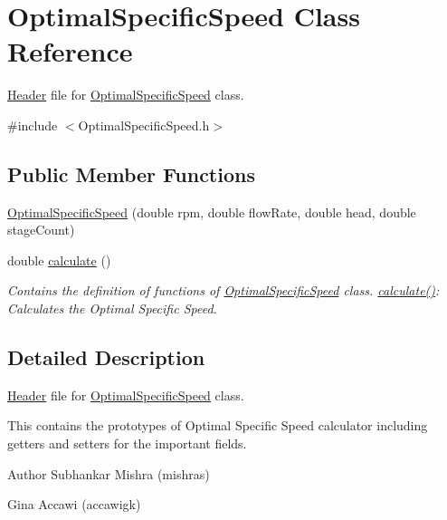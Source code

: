\hypertarget{class_optimal_specific_speed}{}\section{Optimal\+Specific\+Speed Class Reference}
\label{class_optimal_specific_speed}


\hyperlink{class_header}{Header} file for \hyperlink{class_optimal_specific_speed}{Optimal\+Specific\+Speed} class.  




{\ttfamily \#include $<$Optimal\+Specific\+Speed.\+h$>$}

\subsection*{Public Member Functions}
\begin{DoxyCompactItemize}
\item 
\hyperlink{class_optimal_specific_speed_a3cd734e4ecd1a74cb0c25f14dc567eba}{Optimal\+Specific\+Speed} (double rpm, double flow\+Rate, double head, double stage\+Count)
\item 
double \hyperlink{class_optimal_specific_speed_a75c0c0d37edbff80744f2f6e7fe1f4e1}{calculate} ()
\begin{DoxyCompactList}\small\item\em Contains the definition of functions of \hyperlink{class_optimal_specific_speed}{Optimal\+Specific\+Speed} class. \hyperlink{class_optimal_specific_speed_a75c0c0d37edbff80744f2f6e7fe1f4e1}{calculate()}\+: Calculates the Optimal Specific Speed. \end{DoxyCompactList}\end{DoxyCompactItemize}


\subsection{Detailed Description}
\hyperlink{class_header}{Header} file for \hyperlink{class_optimal_specific_speed}{Optimal\+Specific\+Speed} class. 

This contains the prototypes of Optimal Specific Speed calculator including getters and setters for the important fields.

\begin{DoxyAuthor}{Author}
Subhankar Mishra (mishras) 

Gina Accawi (accawigk) 
\end{DoxyAuthor}


